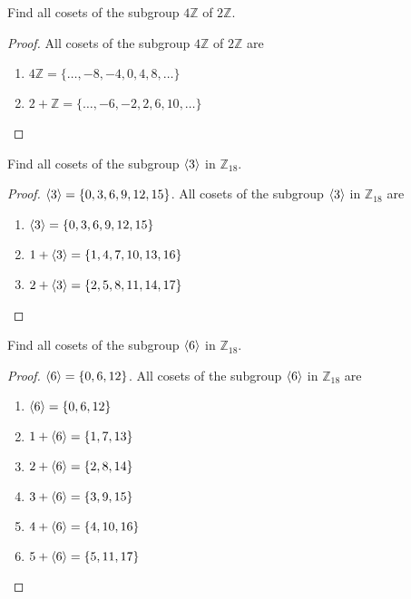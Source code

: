 \newpage
\begin{exercise}
    Find all cosets of the subgroup $4\mathbb{Z}$ of $2\mathbb{Z}$.
\end{exercise}

\begin{proof}
    All cosets of the subgroup $4\mathbb{Z}$ of $2\mathbb{Z}$ are
    \begin{enumerate}[label={(\arabic*)}]
        \item $4\mathbb{Z} = \{ \ldots, -8, -4, 0, 4, 8, \ldots \}$
        \item $2 + \mathbb{Z} = \{ \ldots, -6, -2, 2, 6, 10, \ldots \}$
    \end{enumerate}
\end{proof}

\newpage
\begin{exercise}
    Find all cosets of the subgroup $\left\langle{3}\right\rangle$ in $\mathbb{Z}_{18}$.
\end{exercise}

\begin{proof}
    $\left\langle{3}\right\rangle = \{ 0, 3, 6, 9, 12, 15 \}$. All cosets of the subgroup $\left\langle{3}\right\rangle$ in $\mathbb{Z}_{18}$ are
    \begin{enumerate}[label={(\arabic*)}]
        \item $\left\langle{3}\right\rangle = \{ 0, 3, 6, 9, 12, 15 \}$
        \item $1 + \left\langle{3}\right\rangle = \{ 1, 4, 7, 10, 13, 16 \}$
        \item $2 + \left\langle{3}\right\rangle = \{ 2, 5, 8, 11, 14, 17 \}$
    \end{enumerate}
\end{proof}

\newpage
\begin{exercise}
    Find all cosets of the subgroup $\left\langle{6}\right\rangle$ in $\mathbb{Z}_{18}$.
\end{exercise}

\begin{proof}
    $\left\langle{6}\right\rangle = \{ 0, 6, 12 \}$. All cosets of the subgroup $\left\langle{6}\right\rangle$ in $\mathbb{Z}_{18}$ are
    \begin{enumerate}[label={(\arabic*)}]
        \item $\left\langle{6}\right\rangle = \{ 0, 6, 12 \}$
        \item $1 + \left\langle{6}\right\rangle = \{ 1, 7, 13 \}$
        \item $2 + \left\langle{6}\right\rangle = \{ 2, 8, 14 \}$
        \item $3 + \left\langle{6}\right\rangle = \{ 3, 9, 15 \}$
        \item $4 + \left\langle{6}\right\rangle = \{ 4, 10, 16 \}$
        \item $5 + \left\langle{6}\right\rangle = \{ 5, 11, 17 \}$
    \end{enumerate}
\end{proof}

